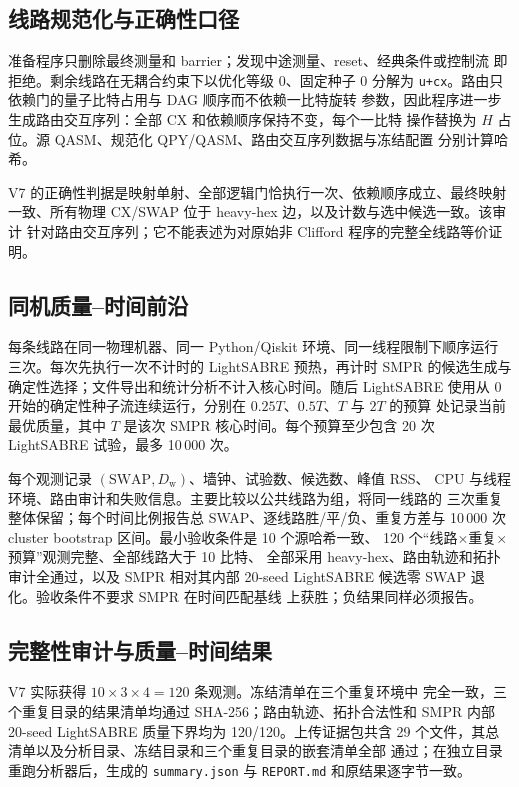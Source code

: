 \documentclass[11pt,a4paper]{article}
\newcommand{\DepthW}{D_{\mathrm w}}
\begin{document}
\subsection{线路规范化与正确性口径}

准备程序只删除最终测量和 barrier；发现中途测量、reset、经典条件或控制流
即拒绝。剩余线路在无耦合约束下以优化等级 0、固定种子 0 分解为
\texttt{u+cx}。路由只依赖门的量子比特占用与 DAG 顺序而不依赖一比特旋转
参数，因此程序进一步生成路由交互序列：全部 CX 和依赖顺序保持不变，每个一比特
操作替换为 $H$ 占位。源 QASM、规范化 QPY/QASM、路由交互序列数据与冻结配置
分别计算哈希。

V7 的正确性判据是映射单射、全部逻辑门恰执行一次、依赖顺序成立、最终映射
一致、所有物理 CX/SWAP 位于 heavy-hex 边，以及计数与选中候选一致。该审计
针对路由交互序列；它不能表述为对原始非 Clifford 程序的完整全线路等价证明。

\subsection{同机质量--时间前沿}

每条线路在同一物理机器、同一 Python/Qiskit 环境、同一线程限制下顺序运行
三次。每次先执行一次不计时的 LightSABRE 预热，再计时 SMPR 的候选生成与
确定性选择；文件导出和统计分析不计入核心时间。随后 LightSABRE 使用从 0
开始的确定性种子流连续运行，分别在 $0.25T$、$0.5T$、$T$ 与 $2T$ 的预算
处记录当前最优质量，其中 $T$ 是该次 SMPR 核心时间。每个预算至少包含
20 次 LightSABRE 试验，最多 10\,000 次。

每个观测记录 $(\mathrm{SWAP},\DepthW)$、墙钟、试验数、候选数、峰值 RSS、
CPU 与线程环境、路由审计和失败信息。主要比较以公共线路为组，将同一线路的
三次重复整体保留；每个时间比例报告总 SWAP、逐线路胜/平/负、重复方差与
10\,000 次 cluster bootstrap 区间。最小验收条件是 10 个源哈希一致、
120 个“线路$\times$重复$\times$预算”观测完整、全部线路大于 10 比特、
全部采用 heavy-hex、路由轨迹和拓扑审计全通过，以及 SMPR 相对其内部
20-seed LightSABRE 候选零 SWAP 退化。验收条件不要求 SMPR 在时间匹配基线
上获胜；负结果同样必须报告。

\subsection{完整性审计与质量--时间结果}

V7 实际获得 $10\times3\times4=120$ 条观测。冻结清单在三个重复环境中
完全一致，三个重复目录的结果清单均通过 SHA-256；路由轨迹、拓扑合法性和
SMPR 内部 20-seed LightSABRE 质量下界均为 120/120。上传证据包共含
29 个文件，其总清单以及分析目录、冻结目录和三个重复目录的嵌套清单全部
通过；在独立目录重跑分析器后，生成的 \texttt{summary.json} 与
\texttt{REPORT.md} 和原结果逐字节一致。
\end{document}
